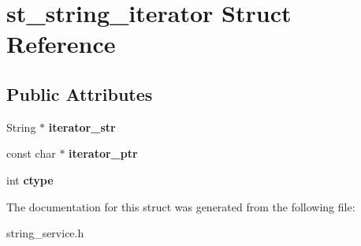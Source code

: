 \hypertarget{structst__string__iterator}{}\section{st\+\_\+string\+\_\+iterator Struct Reference}
\label{structst__string__iterator}
\subsection*{Public Attributes}
\begin{DoxyCompactItemize}
\item 
\mbox{\label{structst__string__iterator_a9256f3c36aea3ffd4665b13e9e0e0885}} 
String $\ast$ {\bfseries iterator\+\_\+str}
\item 
\mbox{\label{structst__string__iterator_ad0d116eb0aa5ad4a6bf2839cfb914f8e}} 
const char $\ast$ {\bfseries iterator\+\_\+ptr}
\item 
\mbox{\label{structst__string__iterator_a95d343615eee2ce1256fb64798e7e8aa}} 
int {\bfseries ctype}
\end{DoxyCompactItemize}


The documentation for this struct was generated from the following file\+:\begin{DoxyCompactItemize}
\item 
string\+\_\+service.\+h\end{DoxyCompactItemize}
